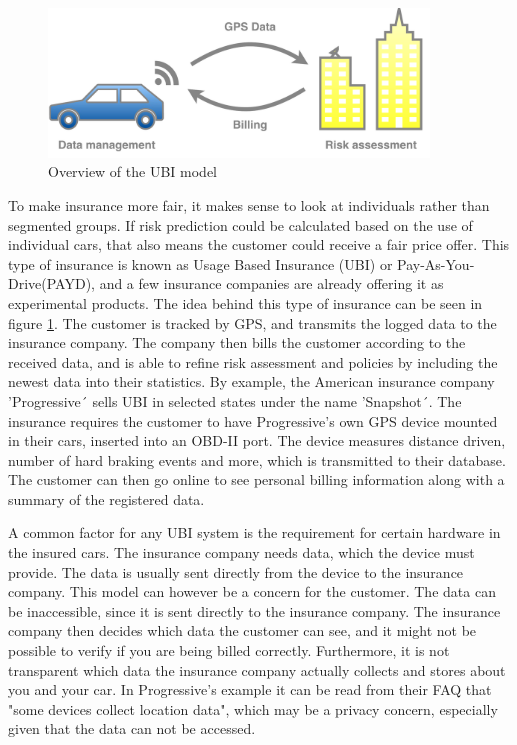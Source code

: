 \begin{figure}[tb]
\centering
\includegraphics[width=0.9\textwidth]{Pictures/Overview}
\caption{Overview of the UBI model}
\label{fig:overview}
\end{figure}

To make insurance more fair, it makes sense to look at individuals rather than segmented groups. If risk prediction could be calculated based on the use of individual cars, that also means the customer could receive a fair price offer. This type of insurance is known as Usage Based Insurance (UBI) or Pay-As-You-Drive(PAYD), and a few insurance companies are already offering it as experimental products. The idea behind this type of insurance can be seen in figure \ref{fig:overview}. The customer is tracked by GPS, and transmits the logged data to the insurance company. The company then bills the customer according to the received data, and is able to refine risk assessment and policies by including the newest data into their statistics.
By example, the American insurance company 'Progressive´ sells UBI in selected states under the name 'Snapshot´\cite{snapshot}. The insurance requires the customer to have Progressive's own GPS device mounted in their cars, inserted into an OBD-II port. The device measures distance driven, number of hard braking events and more, which is transmitted to their database. The customer can then go online to see personal billing information along with a summary of the registered data.

A common factor for any UBI system is the requirement for certain hardware in the insured cars. The insurance company needs data, which the device must provide. The data is usually sent directly from the device to the insurance company. This model can however be a concern for the customer. The data can be inaccessible, since it is sent directly to the insurance company. The insurance company then decides which data the customer can see, and it might not be possible to verify if you are being billed correctly. Furthermore, it is not transparent which data the insurance company actually collects and stores about you and your car. In Progressive's example it can be read from their FAQ that "some devices collect location data", which may be a privacy concern, especially given that the data can not be accessed.

